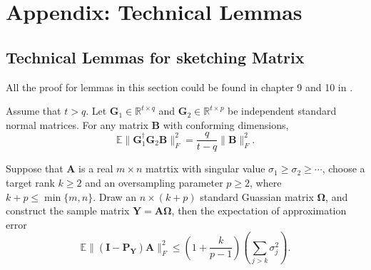 \section{Appendix: Technical Lemmas}
\subsection{Technical Lemmas for sketching Matrix}
All the proof for lemmas in this section could be found in chapter 9 and 10 in \cite{halko2011finding}.
\begin{lem}
\label{lemma:expectation_inverse_gaussian}
Assume that $t>q$. Let $\mathbf{G}_1\in \mathbb{R}^{t\times q}$ and $\mathbf{G}_2\in \mathbb{R}^{t\times p}$ be independent standard normal matrices. For any matrix $\mathbf{B}$ with conforming dimensions, 
\begin{equation}
\mathbb{E} \|\mathbf{G}_1^\dag \mathbf{G}_2 \mathbf{B}\|_F^2 = \frac{q}{t-q} \|\mathbf{B}\|_F^2. 
\end{equation}
\end{lem}

\begin{lem}
\label{lemma:sketchy_column_space_err}
Suppose that $\mathbf{A}$ is a real $m\times n$ matrtix with singular value $\sigma_1\ge \sigma_2\ge \cdots$, choose a target rank $k\ge 2$ and an oversampling parameter $p\ge 2$, where $k+p\le \min\{m,n\}$. Draw an $n\times (k+p)$ standard Guassian matrix $\mathbf{\Omega}$, and construct the sample matrix $\mathbf{Y}=\mathbf{A\Omega}$, then the expectation of approximation error 
\begin{equation}
\mathbb{E}\|(\mathbf{I} - \mathbf{P_Y})\mathbf{A}\|_F^2\le (1+\frac{k}{p-1})(\sum_{j>k} \sigma_j^2).
\end{equation}
\end{lem}

